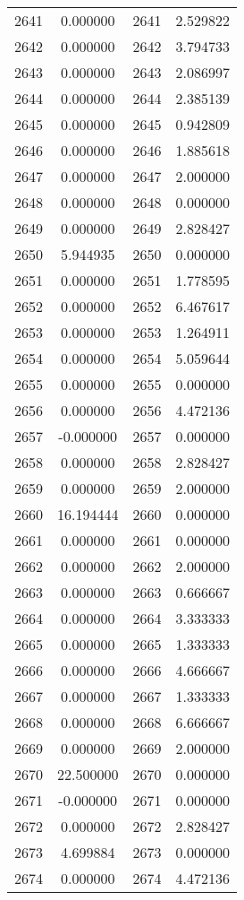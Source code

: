 \documentclass[12pt]{article}
\begin{document}
\begin{longtable}{@{}cccc@{}}
2641 & 0.000000 & 2641 & 2.529822 \\
2642 & 0.000000 & 2642 & 3.794733 \\
2643 & 0.000000 & 2643 & 2.086997 \\
2644 & 0.000000 & 2644 & 2.385139 \\
2645 & 0.000000 & 2645 & 0.942809 \\
2646 & 0.000000 & 2646 & 1.885618 \\
2647 & 0.000000 & 2647 & 2.000000 \\
2648 & 0.000000 & 2648 & 0.000000 \\
2649 & 0.000000 & 2649 & 2.828427 \\
2650 & 5.944935 & 2650 & 0.000000 \\
2651 & 0.000000 & 2651 & 1.778595 \\
2652 & 0.000000 & 2652 & 6.467617 \\
2653 & 0.000000 & 2653 & 1.264911 \\
2654 & 0.000000 & 2654 & 5.059644 \\
2655 & 0.000000 & 2655 & 0.000000 \\
2656 & 0.000000 & 2656 & 4.472136 \\
2657 & -0.000000 & 2657 & 0.000000 \\
2658 & 0.000000 & 2658 & 2.828427 \\
2659 & 0.000000 & 2659 & 2.000000 \\
2660 & 16.194444 & 2660 & 0.000000 \\
2661 & 0.000000 & 2661 & 0.000000 \\
2662 & 0.000000 & 2662 & 2.000000 \\
2663 & 0.000000 & 2663 & 0.666667 \\
2664 & 0.000000 & 2664 & 3.333333 \\
2665 & 0.000000 & 2665 & 1.333333 \\
2666 & 0.000000 & 2666 & 4.666667 \\
2667 & 0.000000 & 2667 & 1.333333 \\
2668 & 0.000000 & 2668 & 6.666667 \\
2669 & 0.000000 & 2669 & 2.000000 \\
2670 & 22.500000 & 2670 & 0.000000 \\
2671 & -0.000000 & 2671 & 0.000000 \\
2672 & 0.000000 & 2672 & 2.828427 \\
2673 & 4.699884 & 2673 & 0.000000 \\
2674 & 0.000000 & 2674 & 4.472136 \\

\end{longtable}
\end{document}
